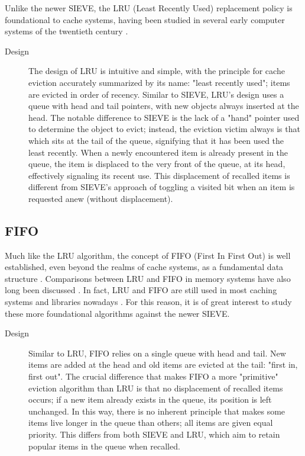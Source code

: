 Unlike the newer SIEVE, the LRU (Least Recently Used) replacement policy is foundational to cache systems, having been studied in several early computer systems of the twentieth century \cite{eval-storage-hierarchies, virtual-storage-study}.

\begin{description}
    \item[Design]
    The design of LRU is intuitive and simple, with the principle for cache eviction accurately summarized by its name: "least recently used"; items are evicted in order of recency. Similar to SIEVE, LRU's design uses a queue with head and tail pointers, with new objects always inserted at the head. The notable difference to SIEVE is the lack of a "hand" pointer used to determine the object to evict; instead, the eviction victim always is that which sits at the tail of the queue, signifying that it has been used the least recently. When a newly encountered item is already present in the queue, the item is displaced to the very front of the queue, at its head, effectively signaling its recent use. This displacement of recalled items is different from SIEVE's approach of toggling a visited bit when an item is requested anew (without displacement).
\end{description}


\subsection{FIFO}

Much like the LRU algorithm, the concept of FIFO (First In First Out) is well established, even beyond the realms of cache systems, as a fundamental data structure \cite{lock-free-fifo}. Comparisons between LRU and FIFO in memory systems have also long been discussed \cite{lru-better-than-fifo}. In fact, LRU and FIFO are still used in most caching systems and libraries nowadays \cite{sieve}. For this reason, it is of great interest to study these more foundational algorithms against the newer SIEVE.

\begin{description}
    \item[Design] Similar to LRU, FIFO relies on a single queue with head and tail. New items are added at the head and old items are evicted at the tail: "first in, first out". The crucial difference that makes FIFO a more "primitive" eviction algorithm than LRU is that no displacement of recalled items occurs; if a new item already exists in the queue, its position is left unchanged. In this way, there is no inherent principle that makes some items live longer in the queue than others; all items are given equal priority. This differs from both SIEVE and LRU, which aim to retain popular items in the queue when recalled.
\end{description}


